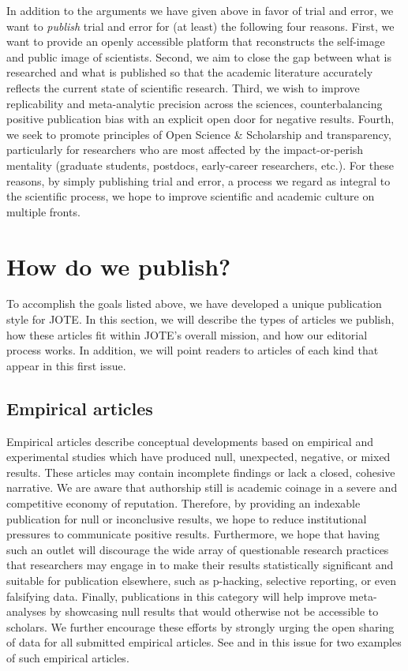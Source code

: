 \documentclass[twocolumn, serif, editorial, authordate]{jote-article}
\begin{document}
In addition to the arguments we have given above in favor of trial and error, we want to \emph{publish} trial and error for (at least) the following four reasons. First, we want to provide an openly accessible platform that reconstructs the self-image and public image of scientists. Second, we aim to close the gap between what is researched and what is published so that the academic literature accurately reflects the current state of scientific research. Third, we wish to improve replicability and meta-analytic precision across the sciences, counterbalancing positive publication bias with an explicit open door for negative results. Fourth, we seek to promote principles of Open Science \& Scholarship and transparency, particularly for researchers who are most affected by the impact-or-perish mentality (graduate students, postdocs, early-career researchers, etc.). For these reasons, by simply publishing trial and error, a process we regard as integral to the scientific process, we hope to improve scientific and academic culture on multiple fronts.

 {} \section*{How do we publish?}

To accomplish the goals listed above, we have developed a unique publication style for JOTE. In this section, we will describe the types of articles we publish, how these articles fit within JOTE's overall mission, and how our editorial process works. In addition, we will point readers to articles of each kind that appear in this first issue.

 {}\subsection*{Empirical articles}

Empirical articles describe conceptual developments based on empirical and experimental studies which have produced null, unexpected, negative, or mixed results. These articles may contain incomplete findings or lack a closed, cohesive narrative. We are aware that authorship still is academic coinage in a severe and competitive economy of reputation. Therefore, by providing an indexable publication for null or inconclusive results, we hope to reduce institutional pressures to communicate positive results. Furthermore, we hope that having such an outlet will discourage the wide array of questionable research practices that researchers may engage in to make their results statistically significant and suitable for publication elsewhere, such as p-hacking, selective reporting, or even falsifying data. Finally, publications in this category will help improve meta-analyses by showcasing null results that would otherwise not be accessible to scholars. We further encourage these efforts by strongly urging the open sharing of data for all submitted empirical articles. See \textcite{Leboeuf2020b} and \textcite{Traxler2020} in this issue for two examples of such empirical articles.
\end{document}
